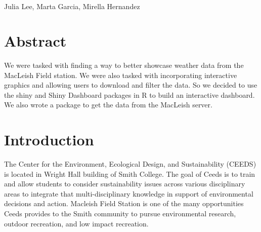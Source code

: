 \documentclass[10pt,letterpaper]{article}
\begin{document}
\vspace*{0.2in}

\begin{flushleft}
{\Large
\textbf{} %
}
\newline
\\
Julia Lee\textsuperscript{},
Marta Garcia\textsuperscript{},
Mirella Hernandez\textsuperscript{}\\
\bigskip
\bigskip
\end{flushleft}
\section*{Abstract}
We were tasked with finding a way to better showcase weather data from
the MacLeish Field station. We were also tasked with incorporating
interactive graphics and allowing users to download and filter the data.
So we decided to use the shiny and Shiny Dashboard packages in R to
build an interactive dashboard. We also wrote a package to get the data
from the MacLeish server.


\linenumbers

\section{Introduction}\label{introduction}

The Center for the Environment, Ecological Design, and Sustainability
(CEEDS) is located in Wright Hall building of Smith College. The goal of
Ceeds is to train and allow students to consider sustainability issues
across various disciplinary areas to integrate that multi-disciplinary
knowledge in support of environmental decisions and action. Macleish
Field Station is one of the many opportunities Ceeds provides to the
Smith community to pursue environmental research, outdoor recreation,
and low impact recreation.
\end{document}
